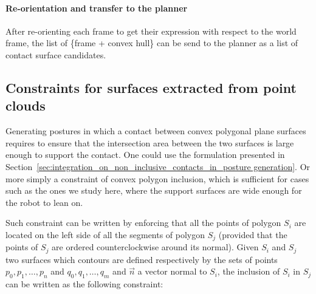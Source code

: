 \paragraph{Re-orientation and transfer to the planner}
After re-orienting each frame to get their expression with respect to the world frame, the list of \{frame + convex hull\} can be send to the planner as a list of contact surface candidates.



\subsection{Constraints for surfaces extracted from point clouds}

Generating postures in which a contact between convex polygonal plane surfaces requires to ensure that the intersection area between the two surfaces is large enough to support the contact.
One could use the formulation presented in Section~\ref{sec:integration_on_non_inclusive_contacts_in_posture generation}.
Or more simply a constraint of convex polygon inclusion, which is sufficient for cases such as the ones we study here, where the support surfaces are wide enough for the robot to lean on.


Such constraint can be written by enforcing that all the points of polygon $S_i$ are located on the left side of all the segments of polygon $S_j$ (provided that the points of $S_j$ are ordered counterclockwise around its normal).
Given $S_i$ and $S_j$ two surfaces which contours are defined respectively by the sets of points ${p_0, p_1, \ldots, p_n}$ and ${q_0, q_1, \ldots, q_m}$ and $\vec{n}$ a vector normal to $S_i$, the inclusion of $S_i$ in $S_j$ can be written as the following constraint:

